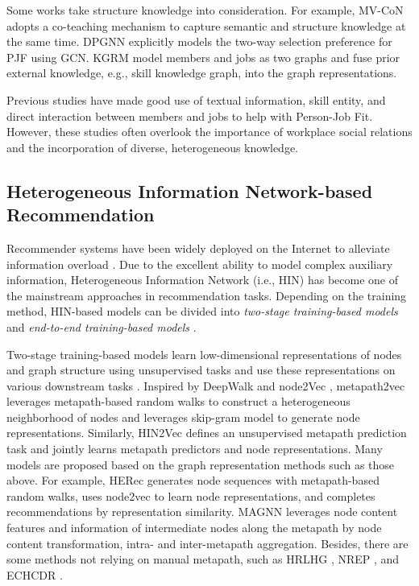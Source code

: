 Some works take structure knowledge into consideration. For example, MV-CoN \cite{bian2020learning} adopts a co-teaching mechanism to capture semantic and structure knowledge at the same time. DPGNN \cite{yang2022modeling} explicitly models the two-way selection preference for PJF using GCN. KGRM \cite{yao2022knowledge} model members and jobs as two graphs and fuse prior external knowledge, e.g., skill knowledge graph, into the graph representations.

Previous studies have made good use of textual information, skill entity, and direct interaction between members and jobs to help with Person-Job Fit. However, these studies often overlook the importance of workplace social relations and the incorporation of diverse, heterogeneous knowledge.

\subsection{Heterogeneous Information Network-based Recommendation}

Recommender systems have been widely deployed on the Internet to alleviate information overload \cite{jacoby1984perspectives}. Due to the excellent ability to model complex auxiliary information, Heterogeneous Information Network (i.e., HIN) has become one of the mainstream approaches in recommendation tasks. Depending on the training method, HIN-based models can be divided into \emph{two-stage training-based models} and \emph{end-to-end training-based models} \cite{liu2022survey}.

Two-stage training-based models learn low-dimensional representations of nodes and graph structure using unsupervised tasks and use these representations on various downstream tasks \cite{du2022understanding,bi2022make,huang2023robust,bi2023mm}. Inspired by DeepWalk \cite{perozzi2014deepwalk} and node2Vec \cite{grover2016node2vec}, metapath2vec \cite{dong2017metapath2vec} leverages metapath-based random walks to construct a heterogeneous neighborhood of nodes and leverages skip-gram model to generate node representations. Similarly, HIN2Vec \cite{fu2017hin2vec} defines an unsupervised metapath prediction task and jointly learns metapath predictors and node representations. Many models are proposed based on the graph representation methods such as those above. For example, HERec generates node sequences with metapath-based random walks, uses node2vec to learn node representations, and completes recommendations by representation similarity. MAGNN \cite{fu2020magnn} leverages node content features and information of intermediate nodes along the metapath by node content transformation, intra- and inter-metapath aggregation. Besides, there are some methods not relying on manual metapath, such as HRLHG \cite{jiang2018cross}, NREP \cite{yang2019citation}, and ECHCDR \cite{li2020heterogeneous}.

